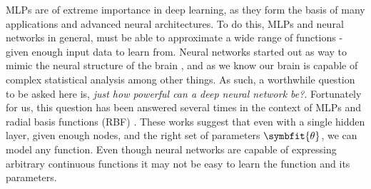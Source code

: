 MLPs are of extreme importance in deep learning, as they form the basis of many applications and advanced neural architectures. To do this, MLPs and neural networks in general, must be able to approximate a wide range of functions - given enough input data to learn from. Neural networks started out as way to mimic the neural structure of the brain \parencite{mcculloch1943logical}, and as we know our brain is capable of complex statistical analysis among other things. As such, a worthwhile question to be asked here is, \textit{just how powerful can a deep neural network be?}.
Fortunately for us, this question has been answered several times in the context of MLPs and radial basis functions (RBF) \parencite{Cybenko1989, Micchelli1986, Hornik1991}. These works suggest that even with a single hidden layer, given enough nodes, and the right set of parameters $\symbfit{\theta}$, we can model any function. Even though neural networks are capable of expressing arbitrary continuous functions it may not be easy to learn the function and its parameters.